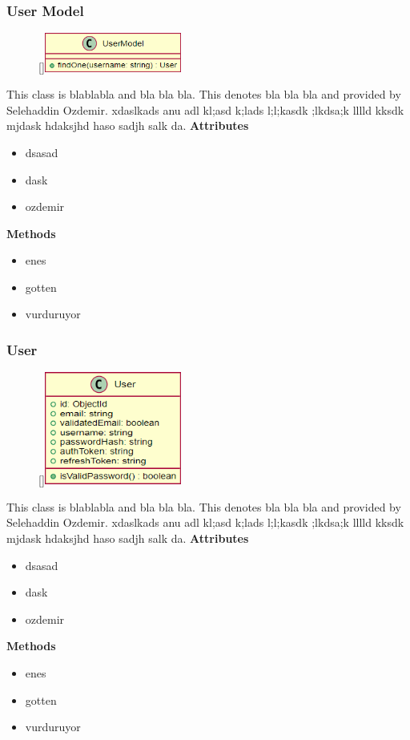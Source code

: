 \subsubsection{User Model}
\begin{figure}
    \raisebox{0pt}[\dimexpr{}\baselineskip\relax]{\includegraphics[width=4.5cm]{classes/auth/1.png}}
\end{figure} 
\par
This class is blablabla and bla bla bla. This denotes bla bla bla and provided by Selehaddin Ozdemir. xdaslkads anu adl kl;asd k;lads l;l;kasdk ;lkdsa;k lllld kksdk mjdask hdaksjhd haso sadjh salk da.
\newline
\newline
\textbf{Attributes}
\begin{itemize}
    \item dsasad
    \item dask
    \item ozdemir
\end{itemize}
\textbf{Methods}
\begin{itemize}
    \item enes
    \item gotten
    \item vurduruyor
\end{itemize}

\subsubsection{User}
\begin{figure}
    \raisebox{0pt}[\dimexpr{}\baselineskip\relax]{\includegraphics[width=4.5cm]{classes/auth/2.png}}
\end{figure} 
\par
This class is blablabla and bla bla bla. This denotes bla bla bla and provided by Selehaddin Ozdemir. xdaslkads anu adl kl;asd k;lads l;l;kasdk ;lkdsa;k lllld kksdk mjdask hdaksjhd haso sadjh salk da.
\newline
\newline
\textbf{Attributes}
\begin{itemize}
    \item dsasad
    \item dask
    \item ozdemir
\end{itemize}
\textbf{Methods}
\begin{itemize}
    \item enes
    \item gotten
    \item vurduruyor
\end{itemize}

